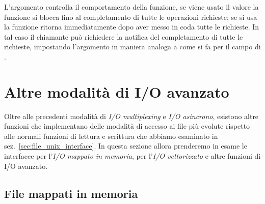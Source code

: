 L'argomento  controlla il comportamento della funzione, se viene
usato il valore  la funzione si blocca fino al completamento
di tutte le operazioni richieste; se si usa  la funzione
ritorna immediatamente dopo aver messo in coda tutte le richieste. In tal caso
il chiamante può richiedere la notifica del completamento di tutte le
richieste, impostando l'argomento  in maniera analoga a come si fa
per il campo  di .




\section{Altre modalità di I/O avanzato}
\label{sec:file_advanced_io}

Oltre alle precedenti modalità di \textit{I/O multiplexing} e \textsl{I/O
  asincrono}, esistono altre funzioni che implementano delle modalità di
accesso ai file più evolute rispetto alle normali funzioni di lettura e
scrittura che abbiamo esaminato in sez.~\ref{sec:file_unix_interface}. In
questa sezione allora prenderemo in esame le interfacce per l'\textsl{I/O
  mappato in memoria}, per l'\textsl{I/O vettorizzato} e altre funzioni di I/O
avanzato.


\subsection{File mappati in memoria}
\label{sec:file_memory_map}

